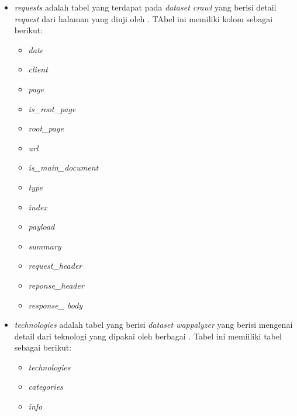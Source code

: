 \begin{itemize}
    \item \textit{requests} adalah tabel yang terdapat pada \textit{dataset crawl} yang berisi detail \textit{request} dari halaman yang diuji oleh \http. TAbel ini memiliki kolom sebagai berikut:
    \begin{itemize}
         \item \textit{date}
        \item \textit{client}
        \item \textit{page}
        \item \textit{is\_root\_page}
        \item \textit{root\_page}
        \item \textit{url}
        \item \textit{is\_main\_document}
        \item \textit{type}
        \item \textit{index}
        \item \textit{payload}
        \item \textit{summary}
        \item \textit{request\_header}
        \item \textit{reponse\_header}
        \item \textit{response\_ body}
    \end{itemize}

    
    \item \textit{technologies}  adalah tabel yang berisi \textit{dataset wappalyzer} yang berisi mengenai detail dari teknologi yang dipakai oleh berbagai \web. Tabel ini memiiliki tabel sebagai berikut:
     \begin{itemize}
        \item \textit{technologies}
        \item \textit{categories}
        \item \textit{info}
    \end{itemize}

\end{itemize}


